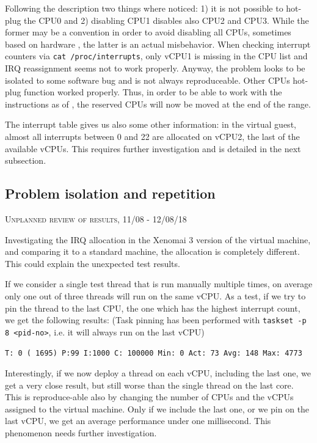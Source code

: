 \documentclass[]{scrartcl}
\begin{document}
Following the description two things where noticed: 1) it is not possible to hot-plug the CPU0 and 2) disabling CPU1 disables also CPU2 and CPU3.
While the former may be a convention in order to avoid disabling all CPUs, sometimes based on hardware \cite{lwn01}, the latter is an actual misbehavior. 
When checking interrupt counters via \texttt{cat /proc/interrupts}, only vCPU1 is missing in the CPU list and IRQ reassignment seems not to work properly. Anyway, the problem looks to be isolated to some software bug and is not always reproduceable. Other CPUs hot-plug function worked properly. 
Thus, in order to be able to work with the instructions as of \cite{lwn01}, the reserved CPUs will now be moved at the end of the range. 

The interrupt table gives us also some other information: in the virtual guest, almost all interrupts between 0 and 22 are allocated on vCPU2, the last of the available vCPUs. This requires further investigation and is detailed in the next subsection.

\subsection{Problem isolation and repetition}
\label{sec:isol}

{\small\textsc{Unplanned review of results, 11/08 - 12/08/18} \bigskip}

Investigating the IRQ allocation in the Xenomai 3 version of the virtual machine, and comparing it to a standard machine, the allocation is completely different. This could explain the unexpected test results.

If we consider a single test thread that is run manually multiple times, on average only one out of three threads will run on the same vCPU.
As a test, if we try to pin the thread to the last CPU, the one which has the highest interrupt count, we get the following results: (Task pinning has been performed with \texttt{taskset -p 8 <pid-no>}, i.e. it will always run on the last vCPU)

\bigskip

\noindent \small \texttt{T: 0 ( 1695) P:99 I:1000 C: 100000 Min:      0 Act:   73 Avg:  148 Max:    4773}

Interestingly, if we now deploy a thread on each vCPU, including the last one, we get a very close result, but still worse than the single thread on the last core.
This is reproduce-able also by changing the number of CPUs and the vCPUs assigned to the virtual machine. 
Only if we include the last one, or we pin on the last vCPU, we get an average performance under one millisecond. This phenomenon needs further investigation.
\end{document}
